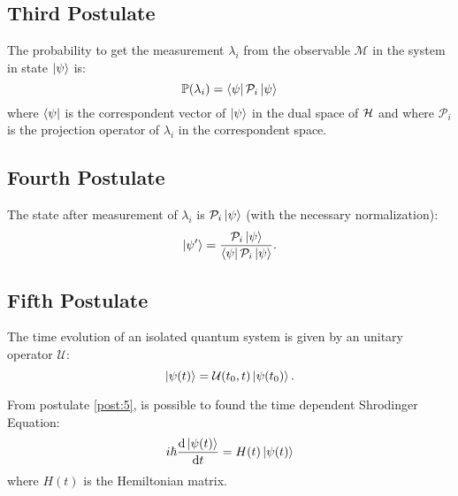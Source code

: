         \subsection{Third Postulate}
        \begin{postulate}
            The probability to get the measurement $\lambda_i$ from the observable 
            $\mathcal{M}$ in the system in state $\ket{\psi}$ is:
            \begin{equation*}
                \mathbb{P}(\lambda_i)=\bra{\psi}\mathcal{P}_i\ket{\psi}
            \end{equation*}
            where $\bra{\psi}$ is the correspondent vector of $\ket{\psi}$ in the 
            dual space of $\mathcal{H}$ and where $\mathcal{P}_i$ is the projection operator
            of $\lambda_i$ in the correspondent space.
            \label{post:3}
        \end{postulate}

        \subsection{Fourth Postulate}
        \begin{postulate}
            The state after measurement of $\lambda_i$ is $\mathcal{P}_i\ket{\psi}$ (with the
            necessary normalization):
            \begin{equation*}
                \ket{\psi'}=\frac{\mathcal{P}_i\ket{\psi}}{\bra{\psi}\mathcal{P}_i\ket{\psi}}.
            \end{equation*}
            \label{post:4}
        \end{postulate}

        \subsection{Fifth Postulate}
        \begin{postulate}
            The time evolution of an isolated quantum system is given by an unitary operator
            $\mathcal{U}$:
            \begin{equation*}
                \ket{\psi(t)}=\mathcal{U}(t_0,t)\ket{\psi(t_0)}.
            \end{equation*}
            \label{post:5}
        \end{postulate}
        \begin{observation*}
            From postulate \ref{post:5}, is possible to found the time dependent Shrodinger Equation:
            \begin{equation*}
                i\hbar\derivative{\ket{\psi(t)}}{t}=H(t)\ket{\psi(t)}
            \end{equation*}
            where $H(t)$ is the Hemiltonian matrix.
        \end{observation*}

